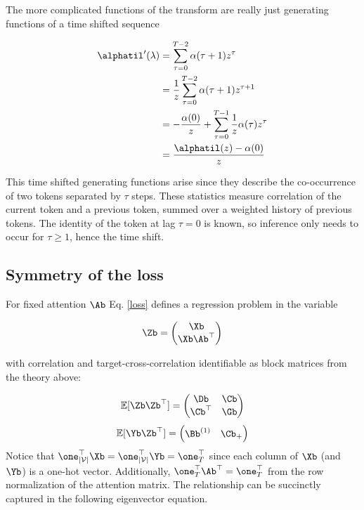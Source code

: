 \documentclass{article}
\begin{document}
The more complicated functions of the transform are really just generating functions of a time shifted sequence 

\begin{align}
    \alphatil'(\lambda) &= \sum_{\tau = 0}^{T-2} \alpha(\tau + 1) z^{\tau}\\
    &= \frac{1}{z}\sum_{\tau = 0}^{T-2}\alpha(\tau + 1) z^{\tau + 1} \\
    &=  - \frac{\alpha(0)}{z} + \sum_{\tau = 0}^{T-1} \frac{1}{z}\alpha(\tau) z^{\tau} \\
    &= \frac{\alphatil(z) - \alpha(0)}{z}
\end{align}

This time shifted generating functions arise since they describe the co-occurrence of two tokens separated by $\tau$ steps. These statistics measure  correlation of the current token and a previous token, summed over a weighted history of previous tokens. The identity of the token at lag $\tau=0$ is known, so inference only needs to occur for $\tau\ge1$, hence the time shift. 

\subsection{Symmetry of the loss}
For fixed attention $\Ab$ Eq. \eqref{loss} defines a regression problem in the variable

\begin{equation}
    \Zb = 
    \begin{pmatrix}
        \Xb \\
        \Xb\Ab^\top
    \end{pmatrix}
\end{equation}

with correlation and target-cross-correlation identifiable as block matrices from the theory above:

\begin{equation}\label{blockXX}
\mathbb{E}[\Zb\Zb^\top] = 
    \begin{pmatrix}
        \Db & \Cb \\
        \Cb^\top & \Gb
    \end{pmatrix}  
\end{equation}
\begin{equation}\label{blockYX}
\mathbb{E}[\Yb\Zb^\top] = 
    \begin{pmatrix}
        \Bb^{(1)} & \Cb_+
    \end{pmatrix}  
\end{equation}
Notice that $\one^\top_{\vert\mathcal{V}\vert} \Xb = \one^\top_{\vert\mathcal{V}\vert} \Yb= \one^\top_T$ since each column of $\Xb$ (and $\Yb$) is a one-hot vector. Additionally, $\one^\top_T \Ab^\top = \one^\top_T$ from the row normalization of the attention matrix. The relationship can be succinctly captured in the following eigenvector equation. 
\end{document}
